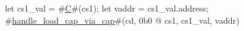 let cs1_val = #\hyperref[sailRISCVzC]{C}#(cs1);
let vaddr = cs1_val.address;
#\hyperref[sailRISCVzhandlezyloadzycapzyviazycap]{handle\_load\_cap\_via\_cap}#(cd, 0b0 @ cs1, cs1_val, vaddr)
